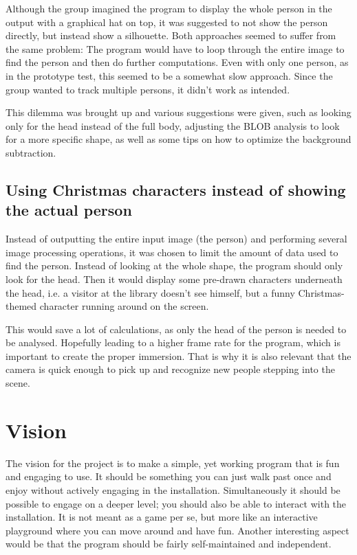 Although the group imagined the program to display the whole person in the output with a graphical hat on top, it was suggested to not show the person directly, but instead show a silhouette. Both approaches seemed to suffer from the same problem: The program would have to loop through the entire image to find the person and then do further computations. Even with only one person, as in the prototype test, this seemed to be a somewhat slow approach. Since the group wanted to track multiple persons, it didn't work as intended.

This dilemma was brought up and various suggestions were given, such as looking only for the head instead of the full body, adjusting the BLOB analysis to look for a more specific shape, as well as some tips on how to optimize the background subtraction.


\subsection{Using Christmas characters instead of showing the actual person}
Instead of outputting the entire input image (the person) and performing several image processing operations, it was chosen to limit the amount of data used to find the person. Instead of looking at the whole shape, the program should only look for the head. Then it would display some pre-drawn characters underneath the head, i.e. a visitor at the library doesn't see himself, but a funny Christmas-themed character running around on the screen.

This would save a lot of calculations, as only the head of the person is needed to be analysed. Hopefully leading to a higher frame rate for the program, which is important to create the proper immersion. That is why it is also relevant that the camera is quick enough to pick up and recognize new people stepping into the scene.
  
\section{Vision}
The vision for the project is to make a simple, yet working program that is fun and engaging to use. It should be something you can just walk past once and enjoy without actively engaging in the installation. Simultaneously it should be possible to engage on a deeper level; you should also be able to interact with the installation. It is not meant as a game per se, but more like an interactive playground where you can move around and have fun. Another interesting aspect would be that the program should be fairly self-maintained and independent.


